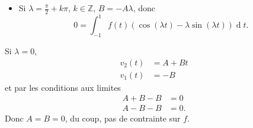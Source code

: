 \documentclass[fontsize=12pt]{article}
\DeclareMathOperator{\newdiff}{d} %
\newcommand{\dif}{\newdiff\!}
\begin{document}
\begin{enumerate}
\begin{itemize}
      \item Si $\lambda = \frac{\pi}{2} + k\pi$, $k \in \mathbb{Z}$, $B = -A\lambda$,
        donc
        \[ 0 = \int_{-1}^1 f(t) (\cos(\lambda t) - \lambda\sin(\lambda t)) \dif t. \]
    \end{itemize}

    Si $\lambda = 0$,
    \begin{align*}
      v_2(t) & = A + Bt\\
      v_1(t) & = -B
    \end{align*}
    et par les conditions aux limites
    \begin{align*}
      A + B - B & = 0\\
      A - B - B & = 0.
    \end{align*}
    Donc $A = B = 0$, du coup, pas de contrainte sur $f$.
\end{enumerate}
\end{document}
